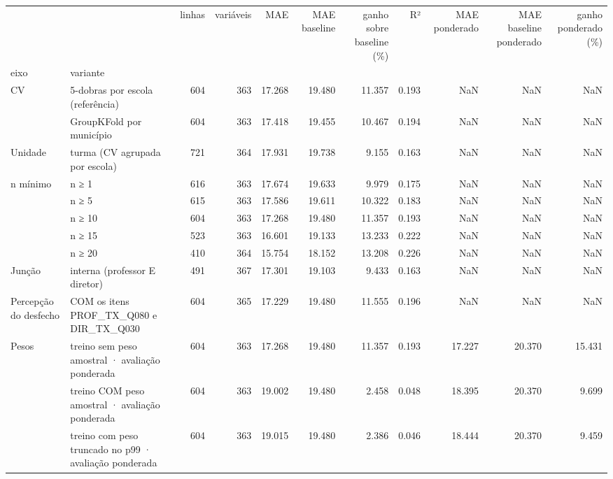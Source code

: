 \begin{tabular}{llrrrrrrrrr}
\toprule
 &  & linhas & variáveis & MAE & MAE baseline & ganho sobre baseline (\%) & R² & MAE ponderado & MAE baseline ponderado & ganho ponderado (\%) \\
eixo & variante &  &  &  &  &  &  &  &  &  \\
\midrule
\multirow[t]{2}{*}{CV} & 5-dobras por escola (referência) & 604 & 363 & 17.268 & 19.480 & 11.357 & 0.193 & NaN & NaN & NaN \\
 & GroupKFold por município & 604 & 363 & 17.418 & 19.455 & 10.467 & 0.194 & NaN & NaN & NaN \\
\cline{1-11}
Unidade & turma (CV agrupada por escola) & 721 & 364 & 17.931 & 19.738 & 9.155 & 0.163 & NaN & NaN & NaN \\
\cline{1-11}
\multirow[t]{5}{*}{n mínimo} & n ≥ 1 & 616 & 363 & 17.674 & 19.633 & 9.979 & 0.175 & NaN & NaN & NaN \\
 & n ≥ 5 & 615 & 363 & 17.586 & 19.611 & 10.322 & 0.183 & NaN & NaN & NaN \\
 & n ≥ 10 & 604 & 363 & 17.268 & 19.480 & 11.357 & 0.193 & NaN & NaN & NaN \\
 & n ≥ 15 & 523 & 363 & 16.601 & 19.133 & 13.233 & 0.222 & NaN & NaN & NaN \\
 & n ≥ 20 & 410 & 364 & 15.754 & 18.152 & 13.208 & 0.226 & NaN & NaN & NaN \\
\cline{1-11}
Junção & interna (professor E diretor) & 491 & 367 & 17.301 & 19.103 & 9.433 & 0.163 & NaN & NaN & NaN \\
\cline{1-11}
Percepção do desfecho & COM os itens PROF\_TX\_Q080 e DIR\_TX\_Q030 & 604 & 365 & 17.229 & 19.480 & 11.555 & 0.196 & NaN & NaN & NaN \\
\cline{1-11}
\multirow[t]{3}{*}{Pesos} & treino sem peso amostral · avaliação ponderada & 604 & 363 & 17.268 & 19.480 & 11.357 & 0.193 & 17.227 & 20.370 & 15.431 \\
 & treino COM peso amostral · avaliação ponderada & 604 & 363 & 19.002 & 19.480 & 2.458 & 0.048 & 18.395 & 20.370 & 9.699 \\
 & treino com peso truncado no p99 · avaliação ponderada & 604 & 363 & 19.015 & 19.480 & 2.386 & 0.046 & 18.444 & 20.370 & 9.459 \\
\cline{1-11}
\bottomrule
\end{tabular}
